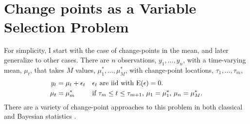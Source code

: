 \section{Change points as a Variable Selection Problem}
\label{dlm:sec:chang-as-vari}

For simplicity, I start with the case of change-points in the mean, and later generalize to other cases.
There are $n$ observations, $y_{1}, \dots, y_{n}$, with a time-varying mean, $\mu_{t}$, that takes $M$ values, $\mu^{*}_{1}, \dots, \mu^{*}_{M}$,  with change-point locations, $\tau_{1}, \dots, \tau_{m}$,
\begin{equation}
  \label{dlm:eq:1}
  \begin{aligned}[t]
    y_{t} & = \mu_{t} + \epsilon_{t} && \text{$\epsilon_{t}$ are iid with $\operatorname{E}(\epsilon) = 0$.} \\
    \mu_{t} &= \mu^{*}_{m} && \text{if $\tau_{m} \leq t \leq \tau_{m + 1}$, $\mu_{1} = \mu^{*}_{1}$, $\mu_{n} = \mu^{*}_{M}$.}
  \end{aligned}
\end{equation}
There are a variety of change-point approaches to this problem in both classical \parencites{Page1954a}{Hinkley1970a}{BaiPerron2003a}{OlshenVenkatramanLucitoEtAl2004}{BaiPerron1998}{KillickFearnheadEckley2012} and Bayesian statistics \parencites{Yao1984}{BarryHartigan1993}{Chib1998}{Fearnhead2006a}{FearnheadLiu2007a}.


